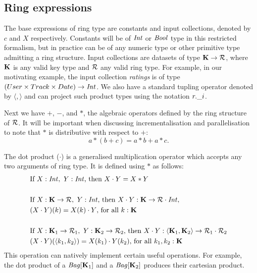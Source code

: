 {{\subsection{Ring expressions} {
The base expressions of ring type are constants and input collections, denoted by $c$ and $X$ respectively. Constants will be of $\textrm{\textit{Int}}$ or $\textrm{\textit{Bool}}$ type in this restricted formalism, but in practice can be of any numeric type or other primitive type admitting a ring structure. Input collections are datasets of type $\mathbf{K} \rightarrow \mathcal{R}$, where $\mathbf{K}$ is any valid key type and $\mathcal{R}$ any valid ring type. For example, in our motivating example, the input collection \textit{ratings} is of type $(User \times Track \times Date) \rightarrow \textrm{\textit{Int}}$. We also have a standard tupling operator denoted by $\langle , \rangle$ and can project such product types using the notation $r.\_i$.

Next we have $+$, $-$, and $\ast$, the algebraic operators defined by the ring structure of $\mathcal{R}$. It will be important when discussing incrementalisation and parallelisation to note that  $\ast$ is distributive with respect to $+$:
\[
a*(b + c) = a*b + a*c.
\]

The dot product ($\cdot$) is a generalised multiplication operator which accepts any two arguments of ring type. It is defined using $*$ as follows:
\begin{equation*}
\begin{split}
& \textrm{If } X: \textrm{\textit{Int}}, \ Y: \textrm{\textit{Int}}\textrm{, then } X \cdot Y = X * Y \\ \\
& \textrm{If } X: \mathbf{K} \rightarrow \mathcal{R}, \ Y: \textrm{\textit{Int}}\textrm{, then } X \cdot Y : \mathbf{K} \rightarrow \mathcal{R} \cdot \textrm{\textit{Int}}, \\
& (X \cdot Y)(k) = X(k) \cdot Y\textrm{, for all }k: \mathbf{K} \\ \\
& \textrm{If } X: \mathbf{K}_1 \rightarrow \mathcal{R}_1, \ Y: \mathbf{K}_2 \rightarrow \mathcal{R}_2\textrm{, then } X \cdot Y : \langle \mathbf{K}_1, \mathbf{K}_2 \rangle \rightarrow \mathcal{R}_1 \cdot \mathcal{R}_2 \\
& (X \cdot Y)(\langle k_1, k_2 \rangle) = X(k_1) \cdot Y(k_2)\textrm{, for all }k_1,k_2: \mathbf{K}
\end{split}
\end{equation*}
This operation can natively implement certain useful operations. For example, the dot product of a $\textrm{\textit{Bag}}[\mathbf{K}_1]$ and a $\textrm{\textit{Bag}}[\mathbf{K}_2]$ produces their cartesian product.

}}}
